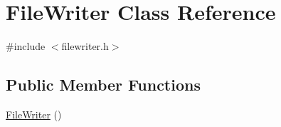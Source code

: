 \hypertarget{class_file_writer}{\section{File\-Writer Class Reference}
\label{class_file_writer}
}


{\ttfamily \#include $<$filewriter.\-h$>$}

\subsection*{Public Member Functions}
\begin{DoxyCompactItemize}
\item 
\hypertarget{class_file_writer_aa6b362f5b306dd3409af81a463e97f40}{\hyperlink{class_file_writer_aa6b362f5b306dd3409af81a463e97f40}{File\-Writer} ()}\label{class_file_writer_aa6b362f5b306dd3409af81a463e97f40}


\end{DoxyCompactItemize}
